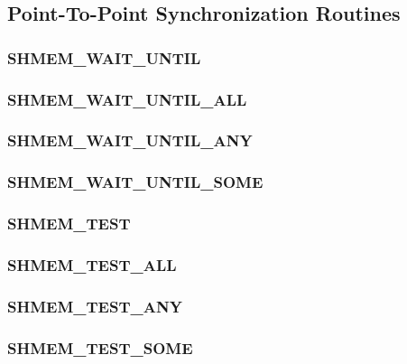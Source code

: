 \documentclass[10pt]{book}
\begin{document}
\subsection{Point-To-Point Synchronization Routines}\label{subsec:p2p_intro}


\subsubsection{\textbf{SHMEM\_WAIT\_UNTIL}}\label{subsec:shmem_wait_until}


\subsubsection{\textbf{SHMEM\_WAIT\_UNTIL\_ALL}}\label{subsec:shmem_wait_until_all}


\subsubsection{\textbf{SHMEM\_WAIT\_UNTIL\_ANY}}\label{subsec:shmem_wait_until_any}


\subsubsection{\textbf{SHMEM\_WAIT\_UNTIL\_SOME}}\label{subsec:shmem_wait_until_some}


\subsubsection{\textbf{SHMEM\_TEST}}\label{subsec:shmem_test}


\subsubsection{\textbf{SHMEM\_TEST\_ALL}}\label{subsec:shmem_test_all}


\subsubsection{\textbf{SHMEM\_TEST\_ANY}}\label{subsec:shmem_test_any}


\subsubsection{\textbf{SHMEM\_TEST\_SOME}}\label{subsec:shmem_test_some}

\end{document}
